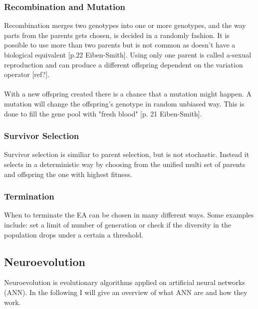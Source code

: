 \documentclass[11pt, a4paper]{article}
\begin{document}
\subsubsection{Recombination and Mutation}
Recombination merges two genotypes into one or more genotypes, and the way parts from the parents gets chosen, is decided in a randomly fashion. It is possible to use more than two parents but is not common as doesn't have a biological equivalent [p.22 Eiben-Smith]. Using only one parent is called a-sexual reproduction and can produce a different offspring dependent on the variation operator [ref?].
\\
\\
With a new offspring created there is a chance that a mutation might happen. A mutation will change the offspring's genotype in random unbiased way. This is done to fill the gene pool with "fresh blood" [p. 21 Eiben-Smith].
\subsubsection{Survivor Selection}
Survivor selection is similiar to parent selection, but is not stochastic. Instead it selects in a deterministic way by choosing from the unified multi set of parents and offspring the one with highest fitness.
\subsubsection{Termination}
When to terminate the EA can be chosen in many different ways. Some examples include: set a limit of number of generation or check if the diversity in the population drops under a certain a threshold.
\subsection{Neuroevolution}
Neuroevolution is evolutionary algorithms applied on artificial neural networks (ANN). In the following I will give an overview of what ANN are and how they work.
\end{document}
